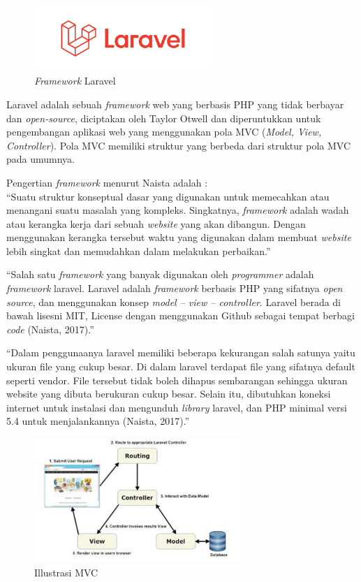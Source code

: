 \begin{figure}
	\centering
	\includegraphics[width=0.6\textwidth]
	{pics/laravel.png}
	\caption{\textit{Framework} Laravel}
	\label{fig:31}
\end{figure}

Laravel adalah sebuah \textit{framework} web yang berbasis PHP yang tidak berbayar dan \textit{open-source}, diciptakan oleh Taylor Otwell dan diperuntukkan untuk pengembangan aplikasi web yang menggunakan pola MVC (\textit{Model, View, Controller}). Pola MVC memiliki struktur yang berbeda dari struktur pola MVC pada umumnya.

Pengertian \textit{framework} menurut Naista adalah : \\
“Suatu struktur konseptual dasar yang digunakan untuk memecahkan atau menangani suatu masalah yang kompleks. Singkatnya, \textit{framework} adalah wadah atau kerangka kerja dari sebuah \textit{website} yang akan dibangun. Dengan menggunakan kerangka tersebut waktu yang digunakan dalam membuat \textit{website} lebih singkat dan memudahkan dalam melakukan perbaikan.”

“Salah satu \textit{framework} yang banyak digunakan oleh \textit{programmer} adalah \textit{framework} laravel. Laravel adalah \textit{framework} berbasis PHP yang sifatnya \textit{open source}, dan menggunakan konsep \textit{model – view – controller}. Laravel berada di bawah lisesni MIT, License dengan menggunakan Github sebagai tempat berbagi \textit{code} (Naista, 2017).”

“Dalam penggunaanya laravel memiliki beberapa kekurangan salah satunya yaitu ukuran file yang cukup besar. Di dalam laravel terdapat file yang sifatnya default seperti vendor. File tersebut tidak boleh dihapus sembarangan sehingga ukuran website yang dibuta berukuran cukup besar. Selain itu, dibutuhkan koneksi internet untuk instalasi dan mengunduh \textit{library} laravel, dan PHP minimal versi 5.4 untuk menjalankannya (Naista, 2017).” 

\begin{figure}
	\centering
	\includegraphics[width=0.7\textwidth]
	{pics/ilustrasimvc.jpg}
	\caption{Illustrasi MVC}
	\label{fig:31}
\end{figure}

